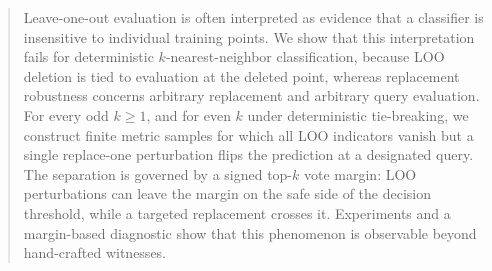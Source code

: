 \begin{abstract}
Leave-one-out evaluation is often interpreted as evidence that a classifier is
insensitive to individual training points.  We show that this interpretation
fails for deterministic $k$-nearest-neighbor classification, because LOO
deletion is tied to evaluation at the deleted point, whereas replacement
robustness concerns arbitrary replacement and arbitrary query evaluation.  For
every odd $k \ge 1$, and for even $k$ under deterministic tie-breaking, we
construct finite metric samples for which all LOO indicators vanish but a single
replace-one perturbation flips the prediction at a designated query.  The
separation is governed by a signed top-$k$ vote margin: LOO perturbations can
leave the margin on the safe side of the decision threshold, while a targeted
replacement crosses it.  Experiments and a margin-based diagnostic show that
this phenomenon is observable beyond hand-crafted witnesses.
\end{abstract}
